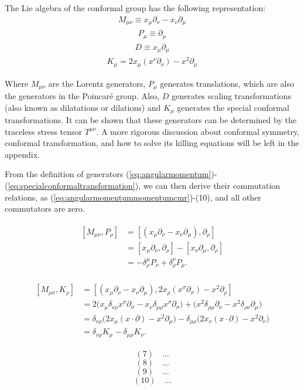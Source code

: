 \documentclass[12pt]{article}
\numberwithin{equation}{section}
\newcommand\be{\begin{eqnarray}}
\newcommand\ee{\end{eqnarray}}
\newcommand\ptl\partial
\newcommand\<\langle
\renewcommand\>\rangle
\renewcommand\.{\cdot}
\begin{document}
The Lie algebra of the conformal group has the following representation:
\be
\label{eq:angularmomentum}
M_{\mu\nu} \equiv x_{\mu}\ptl_{\nu}-x_{\nu}\ptl_{\mu}
\ee
\be
\label{eq:momentum}
P_{\mu}\equiv \ptl_{\mu}
\ee
\be
\label{eq:dilatation}
D\equiv x_{\mu}\partial_{\mu}
\ee
\be
\label{eq:specialconformaltransformation}
K_{\mu} = 2x_{\mu}(x^{\nu}\ptl_{\nu})-x^2\ptl_{\mu}
\ee

Where $M_{\mu\nu}$ are the Lorentz generators, $P_\mu$ generates translations, which are also the generators in the Poincaré group. Also, $D$ generates scaling transformations (also known as dilatations or dilations) and $K_\mu$ generates the special conformal transformations. It can be shown that these generators can be determined by the traceless stress tensor $T^{\mu\nu}$. A more rigorous discussion about conformal symmetry, conformal transformation, and how to solve its killing equations will be left in the appendix.

From the definition of generators (\ref{eq:angularmomentum})-(\ref{eq:specialconformaltransformation}), we can then derive their commutation relations, as (\ref{eq:angularmomentummomentumcmr})-(10), and all other commutators are zero.

\be
\label{eq:angularmomentummomentumcmr}
\begin{split}
[M_{\mu\nu}, P_\rho] &= [(x_\mu \partial_\nu - x_\nu \partial_\mu), \partial_\rho] \\
&= [x_\mu \partial_\nu, \partial_\rho] - [x_\nu \partial_\mu, \partial_\rho] 
\\
&= -\delta_\rho^\mu P_\nu + \delta_\rho^\nu P_\mu.
\end{split}
\ee

\be
\label{eq:angmomSCTcmr}
\begin{split}
[M_{\mu\nu}, K_\rho] &= [(x_\mu \partial_\nu - x_\nu \partial_\mu), 2x_\rho (x^\sigma \partial_\sigma) - x^2 \partial_\rho] \\
&= 2\big(x_\mu \delta_{\nu\rho} x^\sigma \partial_\sigma - x_\nu \delta_{\mu\rho} x^\sigma \partial_\sigma\big) 
+ \big(x^2 \delta_{\rho\mu} \partial_\nu - x^2 \delta_{\rho\nu} \partial_\mu\big) \\
&= \delta_{\nu\rho}\big(2x_\mu (x \cdot \partial) - x^2 \partial_\mu\big) 
- \delta_{\mu\rho}\big(2x_\nu (x \cdot \partial) - x^2 \partial_\nu\big) \\
&= \delta_{\nu\rho} K_\mu - \delta_{\mu\rho} K_\nu.
\end{split}
\ee

\[
(7) \quad \ldots
\]
\[
(8) \quad \ldots
\]
\[
(9) \quad \ldots
\]
\[
(10) \quad \ldots
\]
\end{document}
